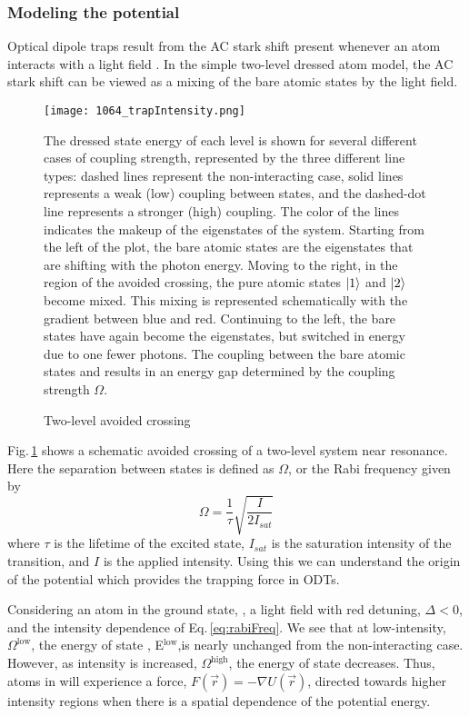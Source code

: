 \subsubsection{Modeling the potential} \label{sssec:1064_modeling}
Optical dipole traps result from the AC stark shift present whenever an atom interacts with a light field \cite{Grimm1999a}.
In the simple two-level dressed atom model, the AC stark shift can be viewed as a mixing of the bare atomic states by the light field.
	\begin{figure} 
		\centerline{
		\texttt{[image: 1064\_trapIntensity.png]}}
		\caption{Two-level avoided crossing}{The dressed state energy of each level is shown for several different cases of coupling strength, represented by the three different line types: dashed lines represent the non-interacting case, solid lines represents a weak (low) coupling between states, and the dashed-dot line represents a stronger (high) coupling. The color of the lines indicates the makeup of the eigenstates of the system. Starting from the left of the plot, the bare atomic states are the eigenstates that are shifting with the photon energy. Moving to the right, in the region of the avoided crossing, the pure atomic states $\left| {1} \right>$ and $\left| {2} \right>$ become mixed. This mixing is represented schematically with the gradient between blue and red. Continuing to the left, the bare states have again become the eigenstates, but switched in energy due to one fewer photons. The coupling between the bare atomic states  and  results in an energy gap determined by the coupling strength $\Omega$.}
		\label{fig:avoidedCrossing}
	\end{figure}
Fig.\,\ref{fig:avoidedCrossing} shows a schematic avoided crossing of a two-level system near resonance.
Here the separation between states is defined as $\Omega$, or the Rabi frequency given by
\begin{equation}
	\Omega = \frac{1}{\tau} \sqrt{\frac{I}{2I_{sat}}}
	\label{eq:rabiFreq}
\end{equation}
where $\tau$ is the lifetime of the excited state, $I_{sat}$ is the saturation intensity of the transition, and $I$ is the applied intensity.
Using this we can understand the origin of the potential which provides the trapping force in ODTs.

Considering an atom in the ground state, , a light field with red detuning, $\Delta < 0$, and the intensity dependence of Eq.\,\ref{eq:rabiFreq}.
We see that at low-intensity, $\Omega^{\text{low}}$, the energy of state , E$^{\text{low}}$,is nearly unchanged from the non-interacting case.
However, as intensity is increased, $\Omega^{\text{high}}$, the energy of state  decreases. 
Thus, atoms in  will experience a force, $F(\vec{r}) = -\nabla U(\vec{r})$, directed towards higher intensity regions when there is a spatial dependence of the potential energy.

